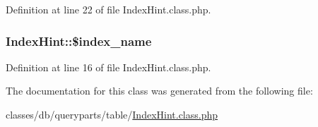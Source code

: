Definition at line 22 of file Index\+Hint.\+class.\+php.

\hypertarget{classIndexHint_a72e2ec1c8ae97c974642bf4342febc60}{
\subsubsection[{\$index\+\_\+name}]{\setlength{\rightskip}{0pt plus 5cm}Index\+Hint\+::\$index\+\_\+name}}\label{classIndexHint_a72e2ec1c8ae97c974642bf4342febc60}


Definition at line 16 of file Index\+Hint.\+class.\+php.



The documentation for this class was generated from the following file\+:\begin{DoxyCompactItemize}
\item 
classes/db/queryparts/table/\hyperlink{IndexHint_8class_8php}{Index\+Hint.\+class.\+php}\end{DoxyCompactItemize}
